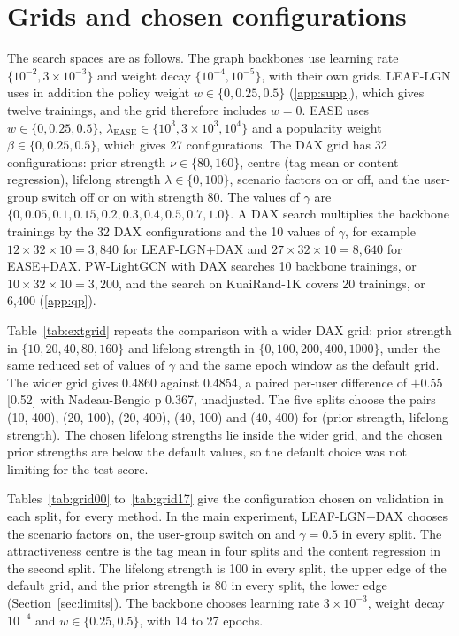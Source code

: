 \section{Grids and chosen configurations}\label{app:grids}

The search spaces are as follows. The graph backbones use learning rate $\{10^{-2}, 3\times10^{-3}\}$ and weight decay $\{10^{-4}, 10^{-5}\}$, with
their own grids. LEAF-LGN uses in addition the policy weight $w\in\{0, 0.25, 0.5\}$ (\ref{app:supp}), which gives twelve trainings,
and the grid therefore includes $w=0$. EASE uses $w\in\{0,0.25,0.5\}$, $\lambda_{\mathrm{EASE}}\in\{10^{3},3\times10^{3},10^{4}\}$ and a popularity
weight $\beta\in\{0,0.25,0.5\}$, which gives 27 configurations. The DAX grid has 32 configurations: prior strength $\nu\in\{80,160\}$, centre (tag
mean or content regression), lifelong strength $\lambda\in\{0,100\}$, scenario factors on or off, and the user-group switch off or on with strength
80. The values of $\gamma$ are $\{0, 0.05, 0.1, 0.15, 0.2, 0.3, 0.4, 0.5, 0.7, 1.0\}$. A DAX search multiplies the backbone trainings by the 32 DAX
configurations and the 10 values of $\gamma$, for example $12\times32\times10=3{,}840$ for LEAF-LGN+DAX and $27\times32\times10=8{,}640$ for EASE+DAX.
PW-LightGCN with DAX searches 10 backbone trainings, or $10\times32\times10=3{,}200$, and the search on KuaiRand-1K covers 20 trainings, or 6,400
(\ref{app:qp}).

Table~\ref{tab:extgrid} repeats the comparison with a wider DAX grid: prior strength in $\{10,20,40,80,160\}$ and lifelong strength in
$\{0,100,200,400,1000\}$, under the same reduced set of values of $\gamma$ and the same epoch window as the default grid. The wider grid gives 0.4860
against 0.4854, a paired per-user difference of $+0.55$ [0.52] with Nadeau-Bengio p 0.367, unadjusted. The five splits choose the pairs (10, 400), (20,
100), (20, 400), (40, 100) and (40, 400) for (prior strength, lifelong strength). The chosen lifelong strengths lie inside the wider grid, and the chosen
prior strengths are below the default values, so the default choice was not limiting for the test score.



Tables~\ref{tab:grid00} to~\ref{tab:grid17} give the configuration chosen on validation in each split, for every method. In the main experiment,
LEAF-LGN+DAX chooses the scenario factors on, the user-group switch on and $\gamma=0.5$ in every split. The attractiveness centre is the tag mean in four
splits and the content regression in the second split. The lifelong strength is 100 in every split, the upper edge of the default grid, and the prior
strength is 80 in every split, the lower edge (Section~\ref{sec:limits}). The backbone chooses learning rate $3\times10^{-3}$, weight decay $10^{-4}$ and
$w\in\{0.25,0.5\}$, with 14 to 27 epochs.

